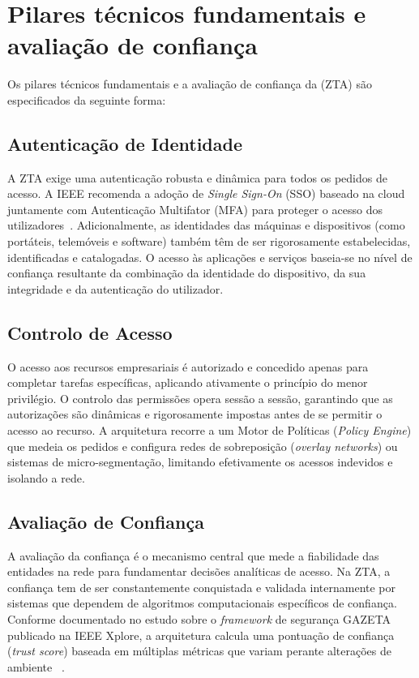 \documentclass{llncs}
\begin{document}
\section{Pilares técnicos fundamentais e avaliação de confiança}
Os pilares técnicos fundamentais e a avaliação de confiança da (ZTA) são especificados da seguinte forma:

\subsection{Autenticação de Identidade}
A ZTA exige uma autenticação robusta e dinâmica para todos os pedidos de acesso. A IEEE recomenda a adoção de \textit{Single Sign-On} (SSO) baseado na cloud juntamente com Autenticação Multifator (MFA) para proteger o acesso dos utilizadores~\cite{digitalprivacy}. Adicionalmente, as identidades das máquinas e dispositivos (como portáteis, telemóveis e software) também têm de ser rigorosamente estabelecidas, identificadas e catalogadas. O acesso às aplicações e serviços baseia-se no nível de confiança resultante da combinação da identidade do dispositivo, da sua integridade e da autenticação do utilizador.

\subsection{Controlo de Acesso}
O acesso aos recursos empresariais é autorizado e concedido apenas para completar tarefas específicas, aplicando ativamente o princípio do menor privilégio. O controlo das permissões opera sessão a sessão, garantindo que as autorizações são dinâmicas e rigorosamente impostas antes de se permitir o acesso ao recurso. A arquitetura recorre a um Motor de Políticas (\textit{Policy Engine}) que medeia os pedidos e configura redes de sobreposição (\textit{overlay networks}) ou sistemas de micro-segmentação, limitando efetivamente os acessos indevidos e isolando a rede.

\subsection{Avaliação de Confiança}
A avaliação da confiança é o mecanismo central que mede a fiabilidade das entidades na rede para fundamentar decisões analíticas de acesso. Na ZTA, a confiança tem de ser constantemente conquistada e validada internamente por sistemas que dependem de algoritmos computacionais específicos de confiança. Conforme documentado no estudo sobre o \textit{framework} de segurança GAZETA publicado na IEEE Xplore, a arquitetura calcula uma pontuação de confiança (\textit{trust score}) baseada em múltiplas métricas que variam perante alterações de ambiente ~\cite{gazeta}.
\end{document}
